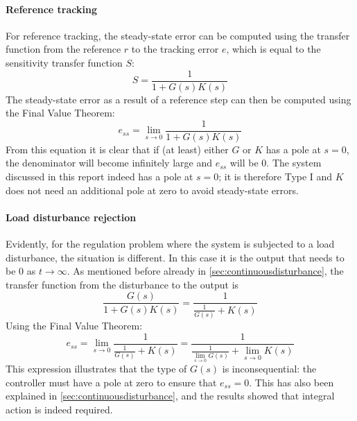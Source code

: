 \paragraph{Reference tracking}
For reference tracking, the steady-state error can be computed using the transfer function from the reference $r$ to the tracking error $e$, which is equal to the sensitivity transfer function $S$:
$$ S = \frac{1}{1 + G(s)K(s)}$$
The steady-state error as a result of a reference step can then be computed using the Final Value Theorem:
$$e_{ss} = \lim_{s\to 0} \frac{1}{1 + G(s)K(s)}$$
From this equation it is clear that if (at least) either $G$ or $K$ has a pole at $s = 0$, the denominator will become infinitely large and $e_{ss}$ will be 0. The system discussed in this report indeed has a pole at $s = 0$; it is therefore Type I and $K$ does not need an additional pole at zero to avoid steady-state errors.   
\paragraph{Load disturbance rejection} 
Evidently, for the regulation problem where the system is subjected to a load disturbance, the situation is different. In this case it is the output that needs to be $0$ as $t \to \infty$. As mentioned before already in \cref{sec:continuousdisturbance}, the transfer function from the disturbance to the output is
$$ \frac{G(s)}{1 + G(s)K(s)} = \frac{1}{\frac{1}{G(s)} + K(s)}$$
Using the Final Value Theorem:
$$e_{ss} = \lim_{s\to 0} \frac{1}{\frac{1}{G(s)} + K(s)} = \frac{1}{\frac{1}{\lim_{s\to 0} G(s)} + \lim_{s \to 0}K(s)}$$
This expression illustrates that the type of $G(s)$ is inconsequential:  the controller must have a pole at zero to ensure that $e_{ss} = 0$. This has also been explained in \cref{sec:continuousdisturbance}, and the results showed that integral action is indeed required.
    
